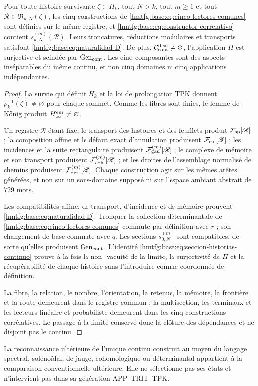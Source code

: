 \begin{theorem}
\label{hmtfg:base:thm:correlacion-cinco}
Pour toute histoire survivante \(\zeta\in H_k\), tout \(N>k\), tout
\(m\geq1\) et tout \(\mathscr R\in\mathfrak R_{k,N}(\zeta)\), les cinq
constructions de \eqref{hmtfg:base:eq:cinco-lectores-comunes} sont définies sur le
même registre, et \eqref{hmtfg:base:eq:constructor-correlativo} contient
\(s_{k,N}^{(m)}(\mathscr R)\). Leurs troncatures, réductions modulaires et
transports satisfont \eqref{hmtfg:base:eq:naturalidad-D}. De plus,
\(\mathcal C_{\rm cont}^{\rm disc}\neq\varnothing\), l'application \(\Pi\)
est surjective et scindée par \(\operatorname{Gen}_{\rm cont}\). Les
cinq composantes sont des aspects inséparables du même continu, et non cinq
domaines ni cinq applications indépendantes.
\end{theorem}

\begin{proof}
La survie qui définit \(H_k\) et la loi de prolongation TPK donnent
\(\rho_k^{-1}(\zeta)\neq\varnothing\) pour chaque sommet. Comme les fibres sont
finies, le lemme de Kőnig produit \(H_\infty^{\rm enr}\neq\varnothing\).

Un registre \(\mathscr R\) étant fixé, le transport des histoires et des feuillets produit \(\mathcal F_{\rm sp}[\mathscr R]\) ; la composition affine et le défaut exact d'annulation produisent \(\mathcal F_{\rm sol}[\mathscr R]\) ; les incidences et la suite rectangulaire produisent \(\mathcal F_{\rm gau}^{(m)}[\mathscr R]\) ; le complexe de mémoire et son transport produisent \(\mathcal F_{\rm coh}^{(m)}[\mathscr R]\) ; et les droites de l'assemblage normalisé de chemins produisent \(\mathcal F_{\rm det}^{(m)}[\mathscr R]\). Chaque construction agit sur les mêmes arêtes générées, et non sur un sous-domaine supposé ni sur l'espace ambiant abstrait de \(729\) mots.

Les compatibilités affine, de transport, d’incidence et de mémoire prouvent
\eqref{hmtfg:base:eq:naturalidad-D}. Tronquer la collection déterminantale de
\eqref{hmtfg:base:eq:cinco-lectores-comunes} commute par
définition avec \(r\) ; son changement de base commute avec \(q\). Les sections
\(s_{0,N}^{(m)}\) sont compatibles, de sorte qu’elles produisent
\(\operatorname{Gen}_{\rm cont}\). L’identité
\eqref{hmtfg:base:eq:seccion-historias-continuo} prouve à la fois la non-
vacuité de la limite, la surjectivité de \(\Pi\) et la récupérabilité de chaque
histoire sans l’introduire comme coordonnée de définition.

La fibre, la relation, le nombre, l'orientation, la retenue, la mémoire, la
frontière et la route demeurent dans le registre commun ; la multisection, les
terminaux et les lecteurs linéaire et probabiliste demeurent dans les cinq
constructions corrélatives. Le passage à la limite conserve donc la clôture des
dépendances et ne disjoint pas le continu.
\end{proof}

La reconnaissance ultérieure de l'unique continu construit au moyen du langage spectral, solénoïdal, de jauge, cohomologique ou déterminantal appartient à la comparaison conventionnelle ultérieure. Elle ne sélectionne pas ses états et n'intervient pas dans sa génération APP--TRIT--TPK.
